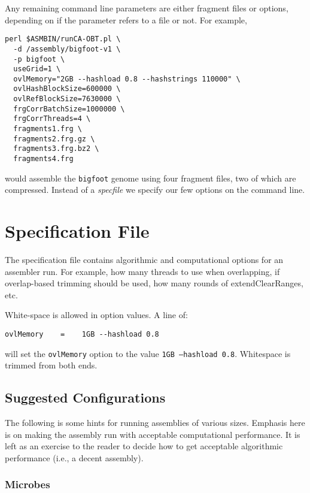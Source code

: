 \documentclass[twoside,11pt]{article}
\begin{document}
Any remaining command line parameters are either fragment files or
options, depending on if the parameter refers to a file or not.  For
example,

\begin{verbatim}
perl $ASMBIN/runCA-OBT.pl \
  -d /assembly/bigfoot-v1 \
  -p bigfoot \
  useGrid=1 \
  ovlMemory="2GB --hashload 0.8 --hashstrings 110000" \
  ovlHashBlockSize=600000 \
  ovlRefBlockSize=7630000 \
  frgCorrBatchSize=1000000 \
  frgCorrThreads=4 \
  fragments1.frg \
  fragments2.frg.gz \
  fragments3.frg.bz2 \
  fragments4.frg
\end{verbatim}

would assemble the {\tt bigfoot} genome using four fragment files, two
of which are compressed.  Instead of a {\it specfile} we specify our
few options on the command line.

\section{Specification File}

The specification file contains algorithmic and computational options
for an assembler run.  For example, how many threads to use when
overlapping, if overlap-based trimming should be used, how many rounds
of extendClearRanges, etc.

White-space is allowed in option values.  A line of:
\begin{verbatim}
ovlMemory    =    1GB --hashload 0.8
\end{verbatim}
will set the {\tt ovlMemory} option to the value {\tt 1GB --hashload
0.8}.  Whitespace is trimmed from both ends.

\subsection{Suggested Configurations}

The following is some hints for running assemblies of various sizes.
Emphasis here is on making the assembly run with acceptable
computational performance.  It is left as an exercise to the reader to
decide how to get acceptable algorithmic performance (i.e., a decent
assembly).

\subsubsection{Microbes}
\end{document}
